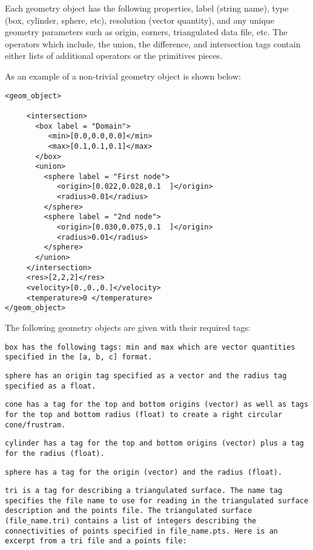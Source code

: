 Each geometry object has the following properties, label (string
name), type (box, cylinder, sphere, etc), resolution (vector
quantity), and any unique geometry parameters such as origin, corners,
triangulated data file, etc.  The operators which include, the union,
the difference, and intersection tags contain either lists of
additional operators or the primitives pieces.

As an example of a non-trivial geometry object is shown below:

\begin{Verbatim}[fontsize=\footnotesize]
<geom_object>

     <intersection>
       <box label = "Domain">
          <min>[0.0,0.0,0.0]</min>
          <max>[0.1,0.1,0.1]</max>
       </box>
       <union>
         <sphere label = "First node">
            <origin>[0.022,0.028,0.1  ]</origin>
            <radius>0.01</radius>
         </sphere>
         <sphere label = "2nd node">
            <origin>[0.030,0.075,0.1  ]</origin>
            <radius>0.01</radius>
         </sphere>
       </union>
     </intersection>
     <res>[2,2,2]</res>
     <velocity>[0.,0.,0.]</velocity>
     <temperature>0 </temperature>
</geom_object>
\end{Verbatim}

The following geometry objects are given with their required tags:

\tt box \normalfont has the following tags: min and max which are vector quantities
specified in the \tt [a, b, c] \normalfont format.

\tt sphere \normalfont has an origin tag specified as a vector and the radius tag
specified as a float.

\tt cone \normalfont has a tag for the top and bottom origins (vector) as well as tags for the
top and bottom radius (float) to create a right circular cone/frustram.

\tt cylinder \normalfont has a tag for the top and bottom origins (vector) plus a tag
for the radius (float).

\tt sphere \normalfont has a tag for the origin (vector) and the radius (float).

\tt tri \normalfont is a tag for describing a triangulated surface.  The name tag
specifies the file name to use for reading in the triangulated surface
description and the points file.  The triangulated surface
(file\_name.tri) contains a list of integers describing the
connectivities of points specified in file\_name.pts.  Here is an
excerpt from a tri file and a points file:


